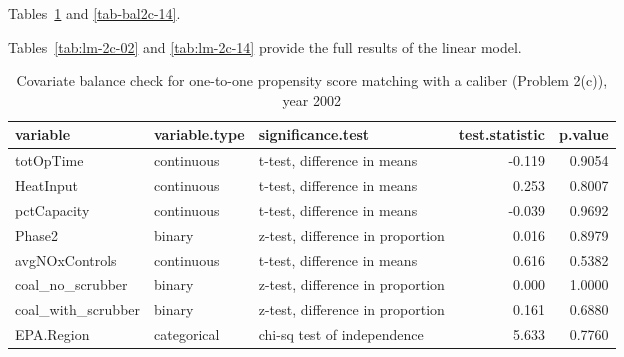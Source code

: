 \documentclass[11pt,letter]{article}
\begin{document}
\begin{enumerate}[(a)]
  Tables~\ref{tab-bal2c-02} and \ref{tab-bal2c-14}. 

  Tables~\ref{tab:lm-2c-02} and \ref{tab:lm-2c-14} provide the full
  results of the linear model.


  \begin{table}[ht]
    \centering
    \begin{tabular}{lllrr}
      \toprule
      variable & variable.type & significance.test & test.statistic & p.value \\ 
      \midrule
      totOpTime & continuous & t-test, difference in means & -0.119 & 0.9054 \\ 
      HeatInput & continuous & t-test, difference in means & 0.253 & 0.8007 \\ 
      pctCapacity & continuous & t-test, difference in means & -0.039 & 0.9692 \\ 
      Phase2 & binary & z-test, difference in proportion & 0.016 & 0.8979 \\ 
      avgNOxControls & continuous & t-test, difference in means & 0.616 & 0.5382 \\ 
      coal\_no\_scrubber & binary & z-test, difference in proportion & 0.000 & 1.0000 \\ 
      coal\_with\_scrubber & binary & z-test, difference in proportion & 0.161 & 0.6880 \\ 
      EPA.Region & categorical & chi-sq test of independence & 5.633 & 0.7760 \\ 
      \bottomrule
    \end{tabular}
    \caption{Covariate balance check for one-to-one propensity score matching with a caliber (Problem 2(c)), year 2002} 
    \label{tab-bal2c-02}
  \end{table}


\end{enumerate}
\end{document}

